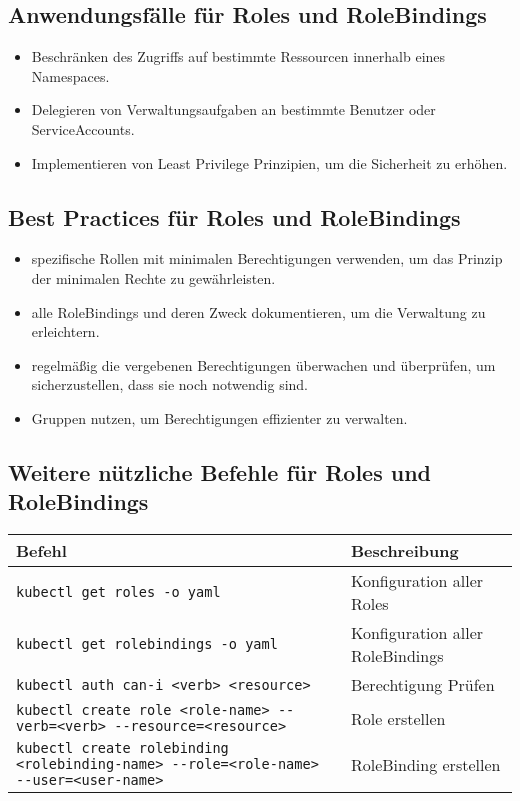 \newpage
\subsection{Anwendungsfälle für Roles und RoleBindings}
\begin{itemize}
    \item Beschränken des Zugriffs auf bestimmte Ressourcen innerhalb eines Namespaces.
    \item Delegieren von Verwaltungsaufgaben an bestimmte Benutzer oder ServiceAccounts.
    \item Implementieren von Least Privilege Prinzipien, um die Sicherheit zu erhöhen.
\end{itemize}

\subsection{Best Practices für Roles und RoleBindings}
\begin{itemize}
    \item spezifische Rollen mit minimalen Berechtigungen verwenden, um das Prinzip der minimalen Rechte zu gewährleisten.
    \item alle RoleBindings und deren Zweck dokumentieren, um die Verwaltung zu erleichtern.
    \item regelmäßig die vergebenen Berechtigungen überwachen und überprüfen, um sicherzustellen, dass sie noch notwendig sind.
    \item Gruppen nutzen, um Berechtigungen effizienter zu verwalten.
\end{itemize}

\subsection{Weitere nützliche Befehle für Roles und RoleBindings}
\begin{tabular}{|p{}|p{}|}
\hline
\textbf{Befehl} & \textbf{Beschreibung} \\
\hline
\texttt{kubectl get roles -o yaml} & Konfiguration aller Roles \\
\texttt{kubectl get rolebindings -o yaml} & Konfiguration aller RoleBindings \\
\texttt{kubectl auth can-i <verb> <resource>} & Berechtigung Prüfen \\
\texttt{kubectl create role <role-name> {-}{-}verb=<verb> {-}{-}resource=<resource>} & Role erstellen \\
\texttt{kubectl create rolebinding <rolebinding-name> {-}{-}role=<role-name> {-}{-}user=<user-name>} & RoleBinding erstellen \\
\hline
\end{tabular}

